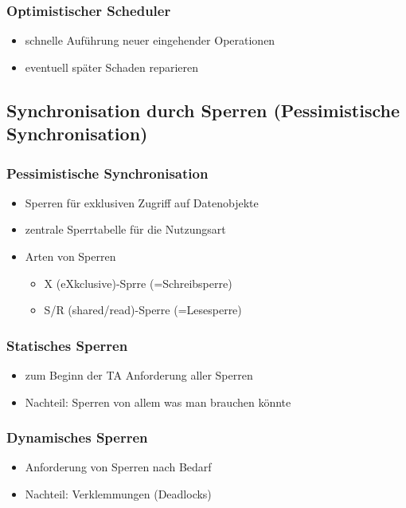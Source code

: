 \documentclass[a4paper]{article}
\begin{document}
    \subsubsection{Optimistischer Scheduler}
    \begin{itemize}
        \item schnelle Auführung neuer eingehender Operationen 
        \item eventuell später Schaden reparieren
    \end{itemize}

\subsection{Synchronisation durch Sperren (Pessimistische Synchronisation)}

    \subsubsection{Pessimistische Synchronisation}
    \begin{itemize}
        \item Sperren für exklusiven Zugriff auf Datenobjekte
        \item zentrale Sperrtabelle für die Nutzungsart
        \item Arten von Sperren
        
        \begin{itemize}
            \item X (eXkclusive)-Sprre (=Schreibsperre)
            \item S/R (shared/read)-Sperre (=Lesesperre)
        \end{itemize}
    \end{itemize}
    
    \subsubsection{Statisches Sperren}
    \begin{itemize}
        \item zum Beginn der TA Anforderung aller Sperren
        \item Nachteil: Sperren von allem was man brauchen könnte
    \end{itemize}

    \subsubsection{Dynamisches Sperren}
    \begin{itemize}
        \item Anforderung von Sperren nach Bedarf
        \item Nachteil: Verklemmungen (Deadlocks)
    \end{itemize}
\end{document}
